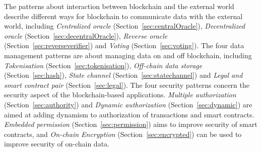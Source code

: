 


The patterns about interaction between blockchain and the external world describe different ways for blockchain to communicate data with the external world, including \textit{Centralized oracle} (Section~\ref{sec:centralOracle}), \textit{Decentralized oracle} (Section~\ref{sec:decentralOracle}), \textit{Reverse oracle} (Section~\ref{sec:reverseverifier}) and \textit{Voting} (Section~\ref{sec:voting}). The four data management patterns are about managing data on and off blockchain, including \textit{Tokenisation} (Section~\ref{sec:tokenisation}), \textit{Off-chain data storage} (Section~\ref{sec:hash}), \textit{State channel} (Section~\ref{sec:statechannel}) and \textit{Legal and smart contract pair} (Section~\ref{sec:legal}). The four security patterns concern the security aspect of the blockchain-based applications. \textit{Multiple authorization} (Section~\ref{sec:authority}) and \textit{Dynamic authorization} (Section~\ref{sec:dynamic}) are aimed at adding dynamism to authorization of transactions and smart contracts. \textit{Embedded permission} (Section~\ref{sec:permission}) aims to improve security of smart contracts, and \textit{On-chain Encryption} (Section~\ref{sec:encrypted}) can be used to improve security of on-chain data.


